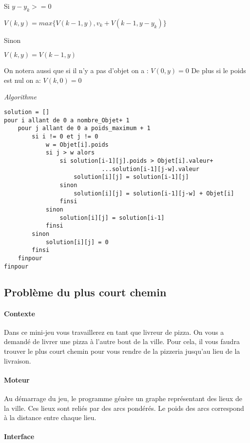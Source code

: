            Si $ y - y_{k} >= 0 $

                $V(k,y) = max\{ V(k-1,y)  ,v_{k} + V(k-1,y-y_{k}) \}$

            Sinon

                $V(k,y) = V(k-1,y)$

            On notera aussi que si il n'y a pas d'objet on a : $V(0,y) = 0$
            De plus si le poids est nul on a: $V(k,0) = 0$

	\emph{Algorithme}

\begin{lstlisting}
solution = []
pour i allant de 0 a nombre_Objet+ 1
    pour j allant de 0 a poids_maximum + 1
        si i != 0 et j != 0
            w = Objet[i].poids
            si j > w alors
                si solution[i-1][j].poids > Objet[i].valeur+
                            ...solution[i-1][j-w].valeur
                    solution[i][j] = solution[i-1][j]
                sinon
                    solution[i][j] = solution[i-1][j-w] + Objet[i]
                finsi
            sinon
                solution[i][j] = solution[i-1]
            finsi
        sinon
            solution[i][j] = 0
        finsi
    finpour
finpour
\end{lstlisting}


\subsection{Problème du plus court chemin}

        \paragraph{Contexte}
	    Dans ce mini-jeu vous travaillerez en tant que livreur de pizza. On vous a demandé de 
	    livrer une pizza à l'autre bout de la ville. Pour cela, il vous faudra trouver le plus court chemin
	    pour vous rendre de la pizzeria jusqu'au lieu de la livraison.
        \paragraph{Moteur}
            Au démarrage du jeu, le programme génère un graphe
            représentant des lieux de la ville. Ces lieux sont reliés par des arcs pondérés.
            Le poids des arcs correspond à la distance entre chaque lieu.

        \paragraph{Interface}

